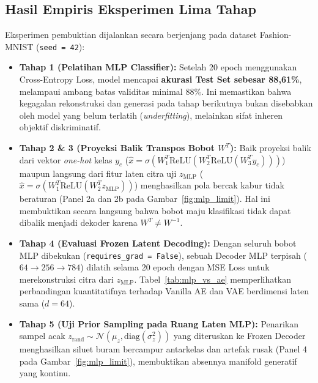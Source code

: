 \documentclass[11pt,a4paper]{article}
\begin{document}
\subsection{Hasil Empiris Eksperimen Lima Tahap}
Eksperimen pembuktian dijalankan secara berjenjang pada dataset Fashion-MNIST (\texttt{seed = 42}):
\begin{itemize}[leftmargin=1.4em, itemsep=2pt]
  \item \textbf{Tahap 1 (Pelatihan MLP Classifier):} Setelah 20 epoch menggunakan Cross-Entropy Loss, model mencapai \textbf{akurasi Test Set sebesar 88,61\%}, melampaui ambang batas validitas minimal 88\%. Ini memastikan bahwa kegagalan rekonstruksi dan generasi pada tahap berikutnya bukan disebabkan oleh model yang belum terlatih (\textit{underfitting}), melainkan sifat inheren objektif diskriminatif.
  \item \textbf{Tahap 2 \& 3 (Proyeksi Balik Transpos Bobot $W^T$):} Baik proyeksi balik dari vektor \textit{one-hot} kelas $y_c$ ($\hat{x} = \sigma(W_1^T \text{ReLU}(W_2^T \text{ReLU}(W_3^T y_c)))$) maupun langsung dari fitur laten citra uji $z_{\text{MLP}}$ ($\hat{x} = \sigma(W_1^T \text{ReLU}(W_2^T z_{\text{MLP}}))$) menghasilkan pola bercak kabur tidak beraturan (Panel 2a dan 2b pada Gambar~\ref{fig:mlp_limit}). Hal ini membuktikan secara langsung bahwa bobot maju klasifikasi tidak dapat dibalik menjadi dekoder karena $W^T \neq W^{-1}$.
  \item \textbf{Tahap 4 (Evaluasi Frozen Latent Decoding):} Dengan seluruh bobot MLP dibekukan (\texttt{requires\_grad = False}), sebuah Decoder MLP terpisah ($64 \rightarrow 256 \rightarrow 784$) dilatih selama 20 epoch dengan MSE Loss untuk merekonstruksi citra dari $z_{\text{MLP}}$. Tabel~\ref{tab:mlp_vs_ae} memperlihatkan perbandingan kuantitatifnya terhadap Vanilla AE dan VAE berdimensi laten sama ($d=64$).
  \item \textbf{Tahap 5 (Uji Prior Sampling pada Ruang Laten MLP):} Penarikan sampel acak $z_{\text{rand}} \sim \mathcal{N}(\mu_z, \text{diag}(\sigma_z^2))$ yang diteruskan ke Frozen Decoder menghasilkan siluet buram bercampur antarkelas dan artefak rusak (Panel 4 pada Gambar~\ref{fig:mlp_limit}), membuktikan absennya manifold generatif yang kontinu.
\end{itemize}
\end{document}
